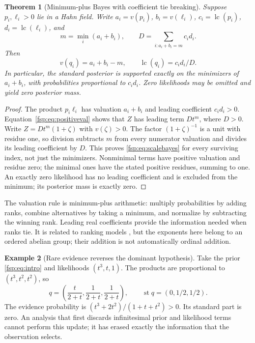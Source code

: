 \documentclass[11pt,a4paper]{article}
\numberwithin{equation}{section}
\newtheorem{theorem}{Theorem}[section]
\theoremstyle{definition}
\newtheorem{example}[theorem]{Example}
\theoremstyle{remark}
\newcommand{\st}{\operatorname{st}}
\newcommand{\lc}{\operatorname{lc}}
\begin{document}
\begin{theorem}[Minimum-plus Bayes with coefficient tie breaking]
\label{fsp:thm:scalebayes}
Suppose $p_i,\ell_i>0$ lie in a Hahn field. Write
$a_i=v(p_i)$, $b_i=v(\ell_i)$, $c_i=\lc(p_i)$,
$d_i=\lc(\ell_i)$, and
\begin{equation}
 m=\min_i(a_i+b_i),\qquad D=\sum_{i:a_i+b_i=m}c_id_i.
\end{equation}
Then
\begin{equation}\label{fsp:eq:scalebayes}
 v(q_i)=a_i+b_i-m,\qquad \lc(q_i)=c_id_i/D.
\end{equation}
In particular, the standard posterior is supported exactly on the
minimizers of $a_i+b_i$, with probabilities proportional to $c_id_i$.
Zero likelihoods may be omitted and yield zero posterior mass.
\end{theorem}
\begin{proof}
The product $p_i\ell_i$ has valuation $a_i+b_i$ and leading coefficient
$c_id_i>0$. Equation~\eqref{fsp:eq:positiveval} shows that $Z$ has leading
term $Dt^m$, where $D>0$. Write $Z=Dt^m(1+\zeta)$ with
$v(\zeta)>0$. The factor $(1+\zeta)^{-1}$ is a unit with residue one,
so division subtracts $m$ from every numerator valuation and divides
its leading coefficient by $D$. This proves \eqref{fsp:eq:scalebayes}
for every surviving index, not just the minimizers. Nonminimal terms
have positive valuation and residue zero; the minimal ones have the
stated positive residues, summing to one. An exactly zero likelihood
has no leading coefficient and is excluded from the minimum; its
posterior mass is exactly zero.
\end{proof}

The valuation rule is minimum-plus arithmetic: multiply probabilities by
adding ranks, combine alternatives by taking a minimum, and normalize by
subtracting the winning rank. Leading real coefficients provide the
information needed when ranks tie. It is related to ranking models
\cite{spohn,hammond}, but the exponents here belong to an ordered abelian
group; their addition is not automatically ordinal addition.

\begin{example}[Rare evidence reverses the dominant hypothesis]
\label{fsp:ex:bayes}
Take the prior \eqref{fsp:eq:intro} and likelihoods $(t^3,t,1)$. The products
are proportional to $(t^3,t^2,t^2)$, so
\begin{equation}\label{fsp:eq:bayesexample}
 q=\left(\frac{t}{2+t},\frac1{2+t},\frac1{2+t}\right),
 \qquad \st q=(0,1/2,1/2).
\end{equation}
The evidence probability is
$(t^3+2t^2)/(1+t+t^2)>0$. Its standard part is zero. An analysis that
first discards infinitesimal prior and likelihood terms cannot perform
this update; it has erased exactly the information that the observation
selects.
\end{example}
\end{document}
